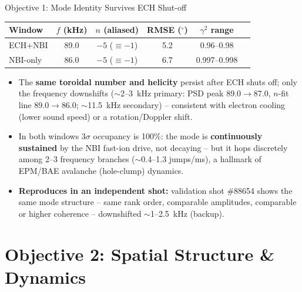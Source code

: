 \documentclass[aspectratio=169]{beamer}
\begin{document}
\begin{frame}{Objective 1: Mode Identity Survives ECH Shut-off}
    \small
    \centering
    \begin{tabular}{lccccc}
        \toprule
        Window & $f$ (kHz) & $n$ (aliased) & RMSE ($^\circ$) & $\gamma^2$ range \\
        \midrule
        ECH+NBI  & 89.0 & $-5$ ($\equiv -1$) & 5.2 & 0.96--0.98 \\
        NBI-only & 86.0 & $-5$ ($\equiv -1$) & 6.7 & 0.997--0.998 \\
        \bottomrule
    \end{tabular}
    \vspace{0.3cm}
    \normalsize
    \begin{itemize}
        \item The \textbf{same toroidal number and helicity} persist after ECH
        shuts off; only the frequency downshifts ($\sim$2--\SI{3}{kHz} primary: PSD peak
        89.0$\to$87.0, $n$-fit line 89.0$\to$86.0; $\sim$\SI{11.5}{kHz} secondary) -- consistent with electron
        cooling (lower sound speed) or a rotation/Doppler shift.
        \item In both windows $3\sigma$ occupancy is 100\%: the mode is
        \textbf{continuously sustained} by the NBI fast-ion drive, not decaying --
        but it hops discretely among 2--3 frequency branches
        ($\sim$0.4--1.3 jumps/ms), a hallmark of EPM/BAE avalanche (hole-clump)
        dynamics.
        \item \textbf{Reproduces in an independent shot:} validation shot
        \#88654 shows the same mode structure -- same rank order,
        comparable amplitudes, comparable or higher coherence -- downshifted
        $\sim$1--\SI{2.5}{kHz} (backup).
    \end{itemize}
\end{frame}

\section{Objective 2: Spatial Structure \& Dynamics}
\end{document}
